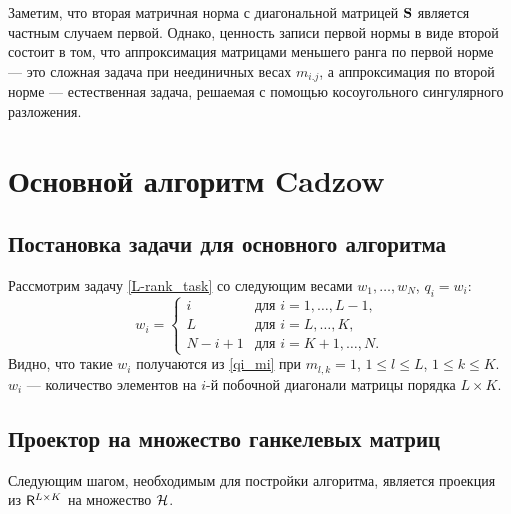 \documentclass[12pt,a4paper,fleqn,leqno]{article}
\DeclareMathOperator{\tr}{tr}
\begin{document}
Заметим, что вторая матричная норма с диагональной матрицей $\mathbf{S}$ является частным случаем первой.
Однако, ценность записи первой нормы в виде
второй состоит в том, что аппроксимация матрицами меньшего ранга по первой норме --- это сложная задача при неединичных весах
$m_{i.j}$, а аппроксимация по второй норме --- естественная задача, решаемая с помощью косоугольного сингулярного разложения.


\section{Основной алгоритм Cadzow}

\subsection{Постановка задачи для основного алгоритма} \label{basic_task}
Рассмотрим задачу \eqref{L-rank_task} со следующим весами $w_1, \ldots , w_N$, $q_i = w_i$:
\begin{equation} \label{hankel_weight}
w_i = \begin{cases}
i & \text{для $i = 1, \ldots, L-1,$}\\
L & \text{для $i = L, \ldots, K,$}\\
N - i + 1 & \text{для $i = K + 1, \ldots, N.$}
\end{cases}
\end{equation}
Видно, что такие $w_i$ получаются из \eqref{qi_mi} при $m_{l, k} = 1$, $1 \le l \le L$, $1 \le k \le K$. $w_i$ --- количество элементов на $i$-й побочной диагонали матрицы порядка $L \times K$.

\subsection{Проектор на множество ганкелевых матриц} \label{basic_hankel_proj}
Следующим шагом, необходимым для постройки алгоритма, является проекция из $\mathsf{R}^{L \times K}$ на множество $\mathcal{H}$.
\end{document}
